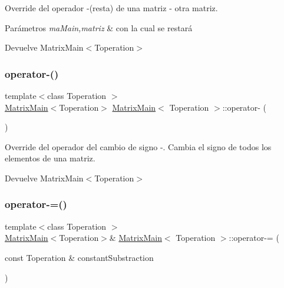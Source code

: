 Override del operador -\/(resta) de una matriz -\/ otra matriz. 


\begin{DoxyParams}{Parámetros}
{\em ma\+Main,matriz} & con la cual se restará \\
\hline
\end{DoxyParams}
\begin{DoxyReturn}{Devuelve}
Matrix\+Main$<$\+Toperation$>$ 
\end{DoxyReturn}
\mbox{\label{classMatrixMain_aef5fed2f8190d857c39ed911601910c2}} 
\subsubsection{\texorpdfstring{operator-\/()}{operator-()}\hspace{0.1cm}{\footnotesize\ttfamily [3/3]}}
{\footnotesize\ttfamily template$<$class Toperation $>$ \\
\hyperlink{classMatrixMain}{Matrix\+Main}$<$Toperation$>$ \hyperlink{classMatrixMain}{Matrix\+Main}$<$ Toperation $>$\+::operator-\/ (\begin{DoxyParamCaption}{ }\end{DoxyParamCaption})}



Override del operador del cambio de signo -\/. Cambia el signo de todos los elementos de una matriz. 

\begin{DoxyReturn}{Devuelve}
Matrix\+Main$<$\+Toperation$>$ 
\end{DoxyReturn}
\mbox{\label{classMatrixMain_ac5c163a3002d2e8de1e05dcac5ea5df1}} 
\subsubsection{\texorpdfstring{operator-\/=()}{operator-=()}\hspace{0.1cm}{\footnotesize\ttfamily [1/2]}}
{\footnotesize\ttfamily template$<$class Toperation $>$ \\
\hyperlink{classMatrixMain}{Matrix\+Main}$<$Toperation$>$\& \hyperlink{classMatrixMain}{Matrix\+Main}$<$ Toperation $>$\+::operator-\/= (\begin{DoxyParamCaption}\item[{const Toperation \&}]{constant\+Substraction }\end{DoxyParamCaption})}



